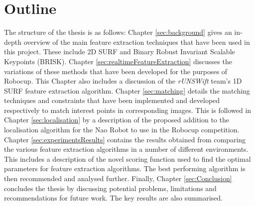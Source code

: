 %




\section{Outline}
\label{sec:outline}
The structure of the thesis is as follows: Chapter \ref{sec:background} gives an in-depth overview of the main feature extraction techniques that have been used in this project. These include 2D SURF and Binary Robust Invariant Scalable Keypoints (BRISK). Chapter \ref{sec:realtimeFeatureExtraction} discusses the variations of these methods that have been developed for the purposes of Robocup. This Chapter also includes a discussion of the \textit{rUNSWift} team's 1D SURF feature extraction algorithm. Chapter \ref{sec:matching} details the matching techniques and constraints that have been implemented and developed respectively to match interest points in corresponding images. This is followed in Chapter \ref{sec:localisation} by a description of the proposed addition to the localisation algorithm for the Nao Robot to use in the Robocup competition. Chapter \ref{sec:experimentsResults} contains the results obtained from comparing the various feature extraction algorithms in a number of different environments. This includes a description of the novel scoring function used to find the optimal parameters for feature extraction algorithms. The best performing algorithm is then recommended and analysed further. Finally, Chapter \ref{sec:Conclusion} concludes the thesis by discussing potential problems, limitations and recommendations for future work. The key results are also summarised.\\